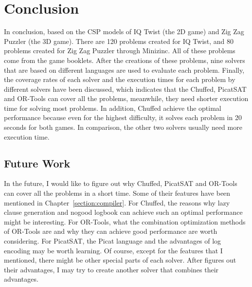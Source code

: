\chapter{Conclusion}
\label{cha:conc}
In conclusion, based on the CSP models of IQ Twist (the 2D game) and Zig Zag Puzzler (the 3D game). There are 120 problems created for IQ Twist, and 80 problems created for Zig Zag Puzzler through Minizinc. All of these problems come from the game booklets. After the creations of these problems, nine solvers that are based on different languages are used to evaluate each problem. Finally, the coverage rates of each solver and the execution times for each problem by different solvers have been discussed, which indicates that the Chuffed, PicatSAT and OR-Tools can cover all the problems, meanwhile, they need shorter execution time for solving most problems. In addition, Chuffed achieve the optimal performance because even for the highest difficulty, it solves each problem in 20 seconds for both games. In comparison, the other two solvers usually need more execution time.
\section{Future Work}
\label{sec:future}
In the future, I would like to figure out why Chuffed, PicatSAT and OR-Tools can cover all the problems in a short time. Some of their features have been mentioned in Chapter~\ref{section:compiler}. 
For Chuffed, the reasons why lazy clause generation and nogood logbook can achieve such an optimal performance might be interesting. 
For OR-Tools, what the combination optimization methods of OR-Tools are and why they can achieve good performance are worth considering.
For PicatSAT, the Picat language and the advantages of log encoding may be worth learning.
Of course, except for the features that I mentioned, there might be other special parts of each solver. After figures out their advantages, I may try to create another solver that combines their advantages.



